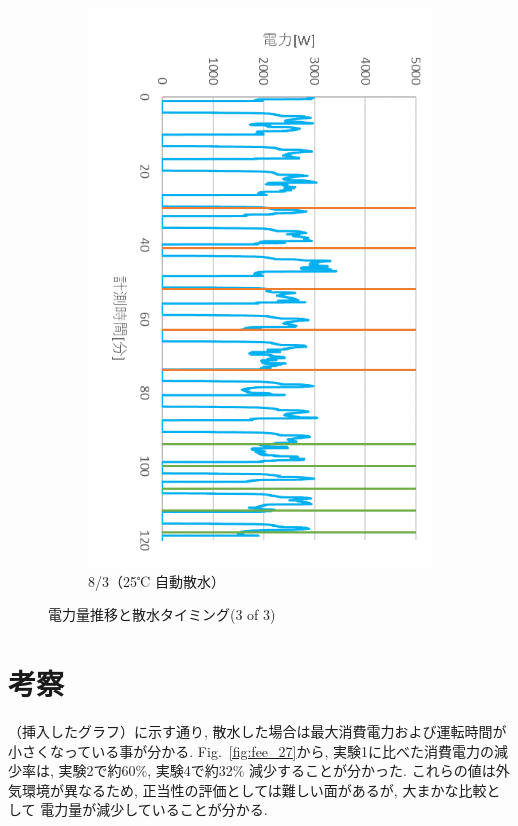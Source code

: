 \documentclass[a4j,fleqn,dvipdfmx,uplatex]{jsarticle}
\newcommand{\figref}[1]{Fig.\ \ref{#1}}
\begin{document}
\begin{figure}[htb]
\begin{subfigure}[b]{0.4\linewidth}
    \includegraphics[width=\linewidth]{img/t_p/20220803.png}
    \caption{8/3（25℃ 自動散水）}
  \end{subfigure}
  \caption{電力量推移と散水タイミング(3 of 3)}\label{fig2:ex_outputs_3/3}
\end{figure}


\section{考察}\label{sec4}
（挿入したグラフ）に示す通り, 散水した場合は最大消費電力および運転時間が
小さくなっている事が分かる. 
\figref{fig:fee_27}から, 実験1に比べた消費電力の減少率は, 実験2で約60\%, 
実験4で約32\% 減少することが分かった. 
これらの値は外気環境が異なるため, 正当性の評価としては難しい面があるが, 大まかな比較として
電力量が減少していることが分かる. 
\end{document}
